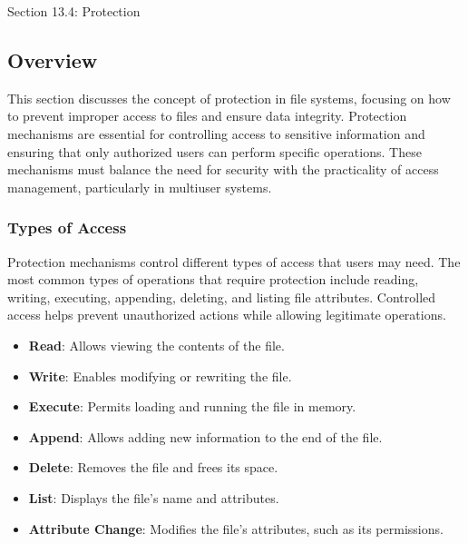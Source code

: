 \begin{notes}{Section 13.4: Protection}
    \subsection*{Overview}

    This section discusses the concept of protection in file systems, focusing on how to prevent improper access to files and ensure data integrity. Protection mechanisms are essential for controlling 
    access to sensitive information and ensuring that only authorized users can perform specific operations. These mechanisms must balance the need for security with the practicality of access management, 
    particularly in multiuser systems.
    
    \subsubsection*{Types of Access}
    
    Protection mechanisms control different types of access that users may need. The most common types of operations that require protection include reading, writing, executing, appending, deleting, 
    and listing file attributes. Controlled access helps prevent unauthorized actions while allowing legitimate operations.
    
    \begin{highlight}
    
        \begin{itemize}
            \item \textbf{Read}: Allows viewing the contents of the file.
            \item \textbf{Write}: Enables modifying or rewriting the file.
            \item \textbf{Execute}: Permits loading and running the file in memory.
            \item \textbf{Append}: Allows adding new information to the end of the file.
            \item \textbf{Delete}: Removes the file and frees its space.
            \item \textbf{List}: Displays the file's name and attributes.
            \item \textbf{Attribute Change}: Modifies the file's attributes, such as its permissions.
        \end{itemize}
    
    \end{highlight}
    

\end{notes}
